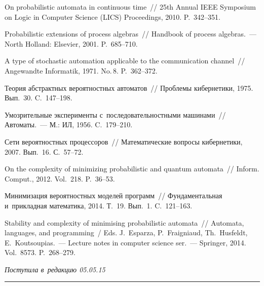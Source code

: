 \begin{multicols}{2}
{{\begin{thebibliography}{99}
On probabilistic automata in continuous time~//
25th Annual IEEE Symposium on Logic
in Computer Science (LICS) Proceedings, 2010.
P.~342--351.

Probabilistic  extensions of process algebras~// Handbook of process algebras.~---
North Holland: Elsevier, 2001. P.~685--710.

A type of stochastic automation applicable to the communication channel~//
Angewandte Informatik, 1971. No.\,8. P.~362--372.

Теория абстрактных вероятностных автоматов~// Проблемы кибернетики, 1975.
Вып.~30. C.~147--198.


Умозрительные эксперименты с~последовательностными машинами~//
Автоматы.~--- М.: ИЛ, 1956.
C.~179--210.

\pagebreak

Сети вероятностных процессоров~// Математические вопросы кибернетики, 2007.
Вып.~16. С.~57--72.

On the complexity of minimizing probabilistic and
quantum automata~// Inform. Comput., 2012. Vol.~218.
P.~36--53.

Минимизация вероятностных моделей программ~//
Фундаментальная и~прикладная математика, 2014. Т.~19. Вып.~1.
C.~121--163.

Stability and complexity of minimising probabilistic automata~//
Automata, languages, and programming~/ Eds. J.~Esparza, P.~Fraigniaud, 
Th.~Husfeldt, E.~Koutsoupias.~--- 
Lecture notes in computer science ser.~--- Springer, 2014.
Vol.~8573. P.~268--279.
 \end{thebibliography}

 }
 }

\end{multicols}

\vspace*{-3pt}

\hfill{\small\textit{Поступила в~редакцию 05.05.15}}


\vspace*{12pt}

\hrule

